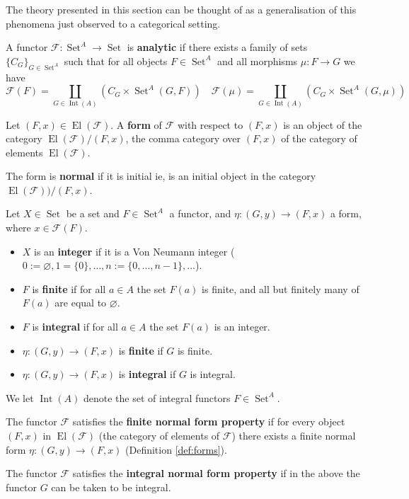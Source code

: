 \documentclass[runningheads]{llncs}
\newcommand{\scr}[1]{\mathscr{#1}}
\newcommand{\lto}{\longrightarrow}
\DeclareMathOperator{\set}{Set}
\begin{document}
The theory presented in this section can be thought of as a generalisation of this phenomena just observed to a categorical setting.

\begin{definition}\label{def:analytic}
		A functor $\scr{F}: \set^A \lto \set$ is \textbf{analytic} if there exists a family of sets $\lbrace C_{G}\rbrace_{G \in \set^A}$ such that for all objects $F \in \set^A$ and all morphisms $\mu: F \lto G$ we have
		\begin{equation*}
			\scr{F}(F) = \coprod_{G \in \operatorname{Int}(A)}(C_G \times \set^A(G,F))\quad \scr{F}(\mu) = \coprod_{G \in \operatorname{Int}(A)}(C_G \times \set^A(G,\mu))
			\end{equation*}
		\end{definition}

\begin{definition}\label{def:forms}
		Let $(F,x) \in \operatorname{El}(\scr{F})$. A \textbf{form} of $\scr{F}$ with respect to $(F,x)$ is an object of the category $\operatorname{El}(\scr{F})/(F,x)$, the comma category over $(F,x)$ of the category of elements $\operatorname{El}(\scr{F})$.
		
		The form is \textbf{normal} if it is initial ie, is an initial object in the category $\operatorname{El}(\scr{F}))/(F,x)$.

  Let $X \in \set$ be a set and $F \in \set^A$ a functor, and $\eta: (G,y) \lto (F,x)$ a form, where $x \in \scr{F}(F)$.
		\begin{itemize}
			\item $X$ is an \textbf{integer} if it is a Von Neumann integer ($0 := \varnothing, 1 = \{0\}, \ldots, n := \{ 0, \ldots, n-1\}, \ldots$).
		\item $F$ is \textbf{finite} if for all $a \in A$ the set $F(a)$ is finite, and all but finitely many of $F(a)$ are equal to $\varnothing$.
		\item $F$ is \textbf{integral} if for all $a \in A$ the set $F(a)$ is an integer.
		\item $\eta: (G,y) \lto (F,x)$ is \textbf{finite} if $G$ is finite.
		\item $\eta: (G,y) \lto (F,x)$ is \textbf{integral} if $G$ is integral.
			\end{itemize}
		We let $\operatorname{Int}(A)$ denote the set of integral functors $F \in \set^A$.

		The functor $\scr{F}$ satisfies the \textbf{finite normal form property} if for every object $(F,x)$ in $\operatorname{El}(\scr{F})$ (the category of elements of $\scr{F}$) there exists a finite normal form $\eta: (G,y) \lto (F,x)$ (Definition \ref{def:forms}).
		
		The functor $\scr{F}$ satisfies the \textbf{integral normal form property} if in the above the functor $G$ can be taken to be integral.
		\end{definition}
\end{document}
